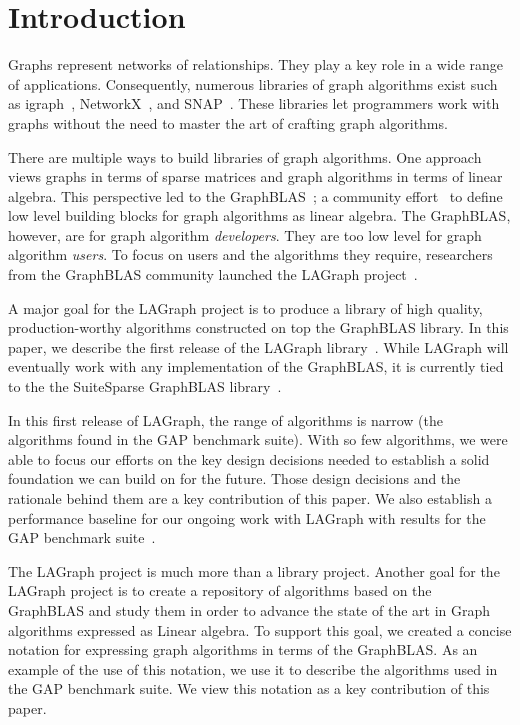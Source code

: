 \section{Introduction}
\label{sec:introduction}

Graphs represent networks of relationships. They play a key role in 
a wide range of applications.   Consequently, numerous libraries of graph algorithms exist 
such as igraph~\cite{igraph}, NetworkX~\cite{DBLP:reference/snam/X18xv}, and SNAP~\cite{DBLP:journals/tist/LeskovecS16}.
These libraries let programmers work with graphs without the need to master the art of crafting graph algorithms.

There are multiple ways to build libraries of graph algorithms.  One approach
views graphs in terms of sparse matrices and graph algorithms in terms of 
linear algebra. This perspective led to the 
GraphBLAS~\cite{DBLP:conf/hpec/MattsonBBBDFFGGHKLLPPRSWY13,DBLP:conf/hpec/MattsonYMBM17}; 
a community effort~\cite{GraphBLASforum} to define low level building blocks for graph algorithms as linear algebra.
The GraphBLAS, however, are for graph algorithm \emph{developers}.  They are too 
low level for graph algorithm \emph{users}.  To focus on users and the 
algorithms they require, researchers from the GraphBLAS community launched the
LAGraph project~\cite{DBLP:conf/ipps/MattsonDKBMMY19}.  

A major goal for the LAGraph project is to produce a library 
of high quality, production-worthy algorithms constructed on top 
the GraphBLAS library.  In this paper, we describe the first release of the LAGraph library~\cite{LAGraphRepo}.
While LAGraph will eventually work with any implementation of the GraphBLAS, it is currently tied to the
the SuiteSparse GraphBLAS library~\cite{SuiteSparseGraphBLAS}.

In this first release of LAGraph, the range of algorithms is narrow (the algorithms found in the GAP benchmark suite).
With so few algorithms, we were able to focus our efforts on the key design decisions needed to establish a solid
foundation we can build on for the future.  Those design decisions 
and the rationale behind them are a key contribution of this paper.  We also establish a performance baseline for
our ongoing work with LAGraph with results for the GAP benchmark suite~\cite{DBLP:journals/corr/BeamerAP15}.

The LAGraph project is much more than a library project.   Another goal for the LAGraph project is to 
create a repository of algorithms based on the GraphBLAS and study them in order to advance the state of the art in 
Graph algorithms expressed as Linear algebra. To support this goal, we created a concise notation for expressing
graph algorithms in terms of the GraphBLAS.   As an example of the use of this notation, we use it to describe 
the algorithms used in the GAP benchmark suite.  We view this notation as a key contribution of this paper.  

